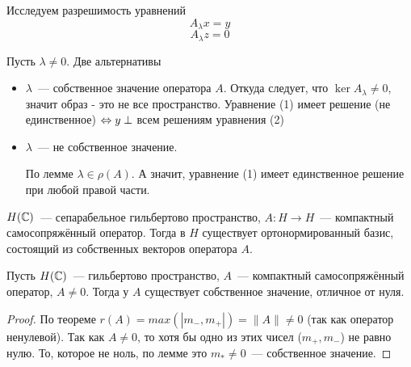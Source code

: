 \begin{theorem}
    \setcounter{equation}{0}
    Исследуем разрешимость уравнений
    \begin{equation}
    A_{\lambda} x = y
    \end{equation}
    \begin{equation}
    A_{\lambda} z = 0
    \end{equation}
    
    Пусть $\lambda \neq 0$. Две альтернативы
    \begin{itemize}
        \item $\lambda$~--- собственное значение оператора $A$.
        Откуда следует, что $\ker A_\lambda \neq 0$, значит образ - это не все пространство. Уравнение (1) имеет решение (не единственное) $\Leftrightarrow y \perp$ всем решениям уравнения (2)
        \item $\lambda$~--- не собственное значение.
        
        По лемме  $\lambda \in \rho(A)$. А значит, 
        уравнение (1) имеет единственное решение при любой правой части.
    \end{itemize}

\end{theorem}



\begin{theorem}\label{12.5}
    $H(\mathbb{C})$~--- сепарабельное гильбертово пространство, $A: H \to H$~--- компактный самосопряжённый оператор. Тогда в $H$ существует ортонормированный базис, состоящий из собственных векторов оператора $A$.
\end{theorem}

\begin{lemma}[4]\label{hilbert-shmidt:lemma4}
        Пусть $H(\mathbb{C})$~--- гильбертово пространство, $A$~--- компактный самосопряжённый оператор, $A \neq 0$.
        Тогда у $A$ существует собственное значение, отличное от нуля.
\end{lemma}

\begin{proof}
    По теореме  $r(A)=max(|m_-, m_+|)= \|A\| \neq 0$ (так как оператор ненулевой).
    Так как $A \neq 0$, то хотя бы одно из этих чисел ($m_+, m_-$) не равно нулю. 
    То, которое не ноль, по лемме  это $m_* \neq 0$~--- собственное значение.
\end{proof}

